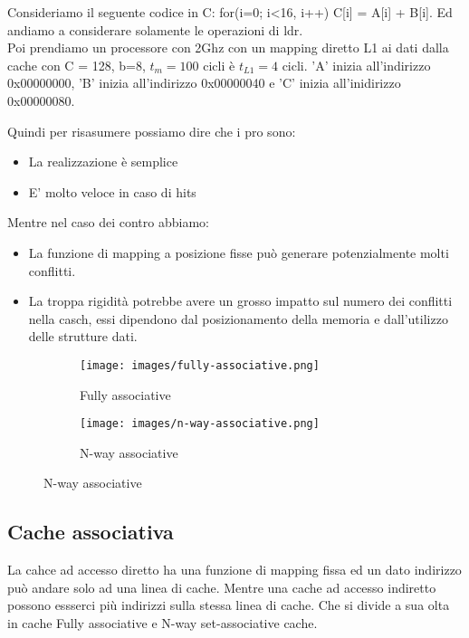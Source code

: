\begin{example}
    Consideriamo il seguente codice in C: for(i=0; i<16, i++) C[i] = A[i] + B[i]. Ed andiamo a considerare solamente le operazioni di ldr.\\
    Poi prendiamo un processore con 2Ghz con un mapping diretto L1 ai dati dalla cache con C = 128, b=8, \(t_m = 100\) cicli è \(t_{L1} = 4\) cicli. 'A' inizia all'indirizzo 0x00000000, 
    'B' inizia all'indirizzo 0x00000040 e 'C' inizia all'inidirizzo 0x00000080. %
\end{example}
\hspace{-15pt}Quindi per risasumere possiamo dire che i pro sono:
\begin{itemize}
    \item La realizzazione è semplice
    \item E' molto veloce in caso di hits
\end{itemize}
Mentre nel caso dei contro abbiamo:
\begin{itemize}
    \item La funzione di mapping a posizione fisse può generare potenzialmente molti conflitti.
    \item La troppa rigidità potrebbe avere un grosso impatto sul numero dei conflitti nella casch, essi dipendono dal posizionamento della memoria e dall'utilizzo delle strutture dati.
\end{itemize}

\begin{figure}[h!]
    \centering
    \begin{subfigure}{.45\textwidth}
        \centering
        \texttt{[image: images/fully-associative.png]}
        \caption{Fully associative}
    \end{subfigure}
    \begin{subfigure}{.45\textwidth}
        \centering
        \texttt{[image: images/n-way-associative.png]}
        \caption{N-way associative}
    \end{subfigure}
\end{figure}

\subsection{Cache associativa}
La cahce ad accesso diretto ha una funzione di mapping fissa ed un dato indirizzo può andare solo ad una linea di cache. Mentre una cache ad accesso indiretto possono essserci più indirizzi sulla stessa
linea di cache.
Che si divide a sua olta in cache Fully associative e N-way set-associative cache.



